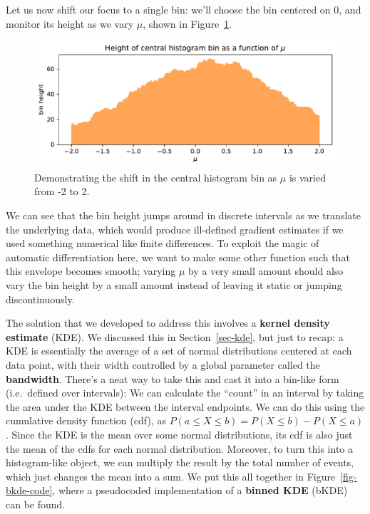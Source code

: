 \documentclass[
  11pt,
  numbers=noendperiod]{book}
\begin{document}
Let us now shift our focus to a single bin: we'll choose the bin
centered on 0, and monitor its height as we vary \(\mu\), shown in
Figure~\ref{fig-bin-height-mu}.

\begin{figure}

{\centering \includegraphics{./diffprog-hep_files/figure-pdf/fig-bin-height-mu-output-1.pdf}

}

\caption{\label{fig-bin-height-mu}Demonstrating the shift in the central
histogram bin as \(\mu\) is varied from -2 to 2.}

\end{figure}

We can see that the bin height jumps around in discrete intervals as we
translate the underlying data, which would produce ill-defined gradient
estimates if we used something numerical like finite differences. To
exploit the magic of automatic differentiation here, we want to make
some other function such that this envelope becomes smooth; varying
\(\mu\) by a very small amount should also vary the bin height by a
small amount instead of leaving it static or jumping discontinuously.

The solution that we developed to address this involves a \textbf{kernel
density estimate} (KDE). We discussed this in Section~\ref{sec-kde}, but
just to recap: a KDE is essentially the average of a set of normal
distributions centered at each data point, with their width controlled
by a global parameter called the \textbf{bandwidth}. There's a neat way
to take this and cast it into a bin-like form (i.e.~defined over
intervals): We can calculate the ``count'' in an interval by taking the
area under the KDE between the interval endpoints. We can do this using
the cumulative density function (cdf), as
\(P(a \leqslant X \leqslant b) = P(X \leqslant b) - P(X \leqslant a)\).
Since the KDE is the mean over some normal distributions, its cdf is
also just the mean of the cdfs for each normal distribution. Moreover,
to turn this into a histogram-like object, we can multiply the result by
the total number of events, which just changes the mean into a sum. We
put this all together in Figure~\ref{fig-bkde-code}, where a pseudocoded
implementation of a \textbf{binned KDE} (bKDE) can be found.
\end{document}
